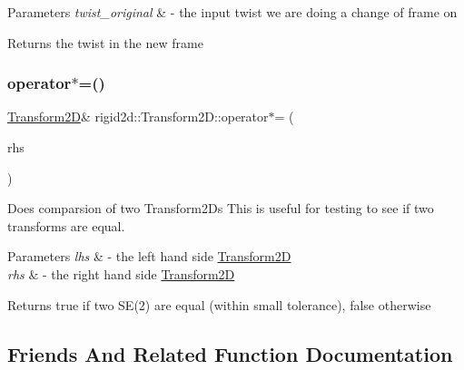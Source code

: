 \begin{DoxyParams}{Parameters}
{\em twist\+\_\+original} & -\/ the input twist we are doing a change of frame on \\
\hline
\end{DoxyParams}
\begin{DoxyReturn}{Returns}
the twist in the new frame 
\end{DoxyReturn}
\mbox{\label{classrigid2d_1_1Transform2D_ae832dd7b1488f6440ba2f98e95b684b5}} 
\subsubsection{\texorpdfstring{operator$\ast$=()}{operator*=()}}
{\footnotesize\ttfamily \hyperlink{classrigid2d_1_1Transform2D}{Transform2D}\& rigid2d\+::\+Transform2\+D\+::operator$\ast$= (\begin{DoxyParamCaption}\item[{const \hyperlink{classrigid2d_1_1Transform2D}{Transform2D} \&}]{rhs }\end{DoxyParamCaption})}



Does comparsion of two Transform2\+Ds This is useful for testing to see if two transforms are equal. 


\begin{DoxyParams}{Parameters}
{\em lhs} & -\/ the left hand side \hyperlink{classrigid2d_1_1Transform2D}{Transform2D} \\
\hline
{\em rhs} & -\/ the right hand side \hyperlink{classrigid2d_1_1Transform2D}{Transform2D} \\
\hline
\end{DoxyParams}
\begin{DoxyReturn}{Returns}
true if two S\+E(2) are equal (within small tolerance), false otherwise 
\end{DoxyReturn}


\subsection{Friends And Related Function Documentation}
\mbox{\label{classrigid2d_1_1Transform2D_ad5239a3fa3a0f9cebd73c39f34c2075f}} 

